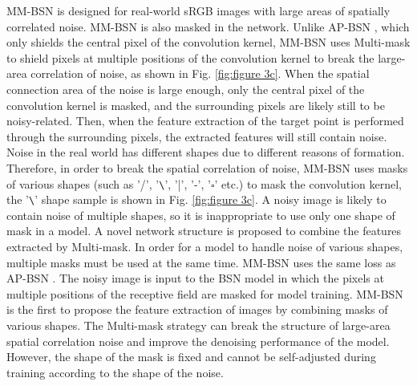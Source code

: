 \documentclass[conference]{IEEEtran}
\begin{document}
MM-BSN \cite{zhang2023mm} is designed for real-world sRGB images with large areas of spatially correlated noise. MM-BSN is also masked in the network. Unlike AP-BSN \cite{lee2022ap}, which only shields the central pixel of the convolution kernel, MM-BSN uses Multi-mask to shield pixels at multiple positions of the convolution kernel to break the large-area correlation of noise, as shown in Fig. \ref{fig:figure 3c}. 
When the spatial connection area of the noise is large enough, only the central pixel of the convolution kernel is masked, and the surrounding pixels are likely still to be noisy-related. Then, when the feature extraction of the target point is performed through the surrounding pixels, the extracted features will still contain noise. Noise in the real world has different shapes due to different reasons of formation. Therefore, in order to break the spatial correlation of noise, MM-BSN uses masks of various shapes (such as '/', '\verb|\|', '|', '-', '$\square$' etc.) to mask the convolution kernel, the '\verb|\|' shape sample is shown in Fig. \ref{fig:figure 3c}. A noisy image is likely to contain noise of multiple shapes, so it is inappropriate to use only one shape of mask in a model. A novel network structure is proposed to combine the features extracted by Multi-mask. In order for a model to handle noise of various shapes, multiple masks must be used at the same time.
MM-BSN uses the same loss as AP-BSN \cite{lee2022ap}. The noisy image is input to the BSN model in which the pixels at multiple positions of the receptive field are masked for model training.
MM-BSN is the first to propose the feature extraction of images by combining masks of various shapes. The Multi-mask strategy can break the structure of large-area spatial correlation noise and improve the denoising performance of the model. However, the shape of the mask is fixed and cannot be self-adjusted during training according to the shape of the noise.
\end{document}
